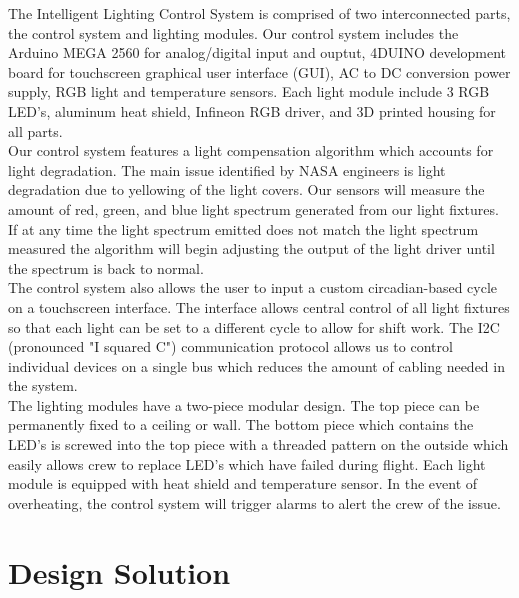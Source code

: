 \documentclass[12pt,a4paper]{report}
\begin{document}
The Intelligent Lighting Control System is comprised of two interconnected parts, the control system and lighting modules. Our control system includes the Arduino MEGA 2560 for analog/digital input and ouptut, 4DUINO development board for touchscreen graphical user interface (GUI), AC to DC conversion power supply, RGB light and temperature sensors. Each light module include 3 RGB LED's, aluminum heat shield, Infineon RGB driver, and 3D printed housing for all parts.\\ \linebreak
Our control system features a light compensation algorithm which accounts for light degradation. The main issue identified by NASA engineers is light degradation due to yellowing of the light covers. Our sensors will measure the amount of red, green, and blue light spectrum generated from our light fixtures. If at any time the light spectrum emitted does not match the light spectrum measured the algorithm will begin adjusting the output of the light driver until the spectrum is back to normal.\\ \linebreak
The control system also allows the user to input a custom circadian-based cycle on a touchscreen interface. The interface allows central control of all light fixtures so that each light can be set to a different cycle to allow for shift work. The I2C (pronounced "I squared C") communication protocol allows us to control individual devices on a single bus which reduces the amount of cabling needed in the system.\\ \linebreak
The lighting modules have a two-piece modular design. The top piece can be permanently fixed to a ceiling or wall. The bottom piece which contains the LED's is screwed into the top piece with a threaded pattern on the outside which easily allows crew to replace LED's which have failed during flight. Each light module is equipped with heat shield and temperature sensor. In the event of overheating, the control system will trigger alarms to alert the crew of the issue.



\section{Design Solution}
\end{document}
